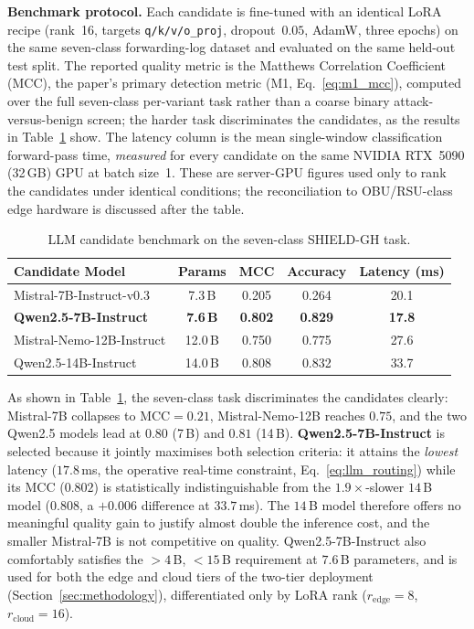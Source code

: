 \documentclass[12pt, a4paper]{report}
\newcommand{\mypar}{\vspace{0.8em}\noindent}
\begin{document}
\mypar
\textbf{Benchmark protocol.}
Each candidate is fine-tuned with an identical LoRA recipe (rank~16, targets
\texttt{q/k/v/o\_proj}, dropout~$0.05$, AdamW, three epochs) on the same
seven-class forwarding-log dataset and evaluated on the same held-out test split.
The reported quality metric is the Matthews Correlation Coefficient (MCC), the
paper's primary detection metric (M1, Eq.~\eqref{eq:m1_mcc}), computed over the
full seven-class per-variant task rather than a coarse binary attack-versus-benign
screen; the harder task discriminates the candidates, as the results in
Table~\ref{tab:llm_selection} show. The latency column is the mean single-window
classification forward-pass time, \emph{measured} for every candidate on the same
NVIDIA RTX~5090 (32\,GB) GPU at batch size~1. These are server-GPU figures used
only to rank the candidates under identical conditions; the reconciliation to
OBU/RSU-class edge hardware is discussed after the table.

\begin{table}[H]
\renewcommand{\arraystretch}{1.3}
\caption{LLM candidate benchmark on the seven-class SHIELD-GH task.}
\label{tab:llm_selection}
\centering
\small
\begin{tabular}{|l|c|c|c|c|}
\hline
\textbf{Candidate Model} & \textbf{Params} & \textbf{MCC} &
\textbf{Accuracy} & \textbf{Latency (ms)} \\
\hline
Mistral-7B-Instruct-v0.3 & 7.3\,B & 0.205 & 0.264 & 20.1 \\
\hline
\textbf{Qwen2.5-7B-Instruct} & \textbf{7.6\,B} & \textbf{0.802} &
\textbf{0.829} & \textbf{17.8} \\
\hline
Mistral-Nemo-12B-Instruct & 12.0\,B & 0.750 & 0.775 & 27.6 \\
\hline
Qwen2.5-14B-Instruct & 14.0\,B & 0.808 & 0.832 & 33.7 \\
\hline
\end{tabular}
\end{table}

As shown in Table~\ref{tab:llm_selection}, the seven-class task discriminates the
candidates clearly: Mistral-7B collapses to $\text{MCC}=0.21$, Mistral-Nemo-12B
reaches $0.75$, and the two Qwen2.5 models lead at $0.80$ (7\,B) and $0.81$
(14\,B). \textbf{Qwen2.5-7B-Instruct} is selected because it jointly maximises
both selection criteria: it attains the \emph{lowest} latency ($17.8$\,ms, the
operative real-time constraint, Eq.~\eqref{eq:llm_routing}) while its MCC
($0.802$) is statistically indistinguishable from the $1.9\times$-slower
$14$\,B model ($0.808$, a $+0.006$ difference at $33.7$\,ms). The $14$\,B model
therefore offers no meaningful quality gain to justify almost double the
inference cost, and the smaller Mistral-7B is not competitive on quality.
Qwen2.5-7B-Instruct also comfortably satisfies the $>4$\,B, $<15$\,B requirement
at $7.6$\,B parameters, and is used for both the edge and cloud tiers of the
two-tier deployment (Section~\ref{sec:methodology}), differentiated only by LoRA
rank ($r_{\text{edge}}=8$, $r_{\text{cloud}}=16$).
\end{document}
